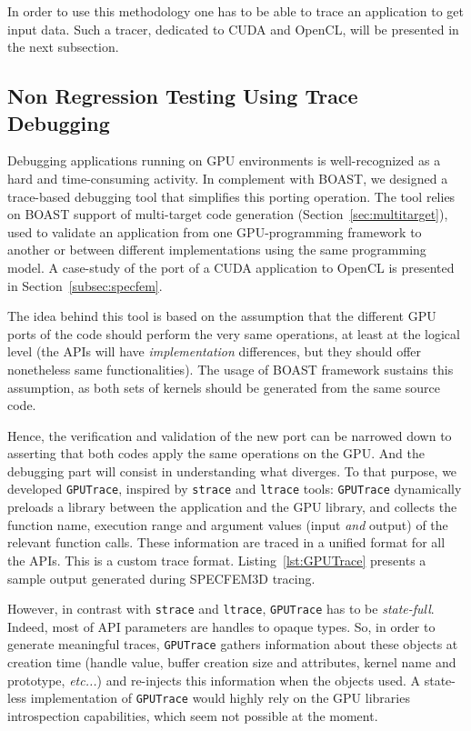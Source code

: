 \documentclass{IEEEtran}
\newcommand{\latin}[1]{\textit{#1}}
\newcommand{\etc}[1]{\latin{etc...}}
\newcommand{\code}[1]{\texttt{#1}}
\begin{document}
In order to use this methodology one has to be able to trace an application to
get input data. Such a tracer, dedicated to CUDA and OpenCL, will be presented
in the next subsection.

\subsection{Non Regression Testing Using Trace Debugging}
\label{sec:gputrace}

Debugging applications running on GPU environments is well-recognized as a hard
and time-consuming activity. In complement with BOAST, we designed a trace-based
debugging tool that simplifies this porting operation. The tool relies on BOAST
support of multi-target code generation (Section~\ref{sec:multitarget}), used to
validate an application from one GPU-programming framework to another or between
different implementations using the same programming model. A case-study of the
port of a CUDA application to OpenCL is presented in
Section~\ref{subsec:specfem}.

The idea behind this tool is based on the assumption that the different GPU
ports of the code should perform the very same operations, at least at the
logical level (the APIs will have \emph{implementation} differences, but they
should offer nonetheless same functionalities). The usage of BOAST framework
sustains this assumption, as both sets of kernels should be generated from the
same source code.

Hence, the verification and validation of the new port can be narrowed down to
asserting that both codes apply the same operations on the GPU. And the
debugging part will consist in understanding what diverges. To that purpose, we
developed \code{GPUTrace}, inspired by \code{strace} and \code{ltrace} tools:
\code{GPUTrace} dynamically preloads a library between the application and the
GPU library, and collects the function name, execution range and argument
values (input \emph{and} output) of the relevant function calls. These
information are traced in a unified format for all the APIs. This is a custom
trace format. Listing~\ref{lst:GPUTrace} presents a sample output generated
during SPECFEM3D tracing.

However, in contrast with \code{strace} and \code{ltrace}, \code{GPUTrace} has
to be \emph{state-full}. Indeed, most of API parameters are handles to opaque
types. So, in order to generate meaningful traces, \code{GPUTrace} gathers
information about these objects at creation time (handle value, buffer creation
size and attributes, kernel name and prototype, \etc{}) and re-injects this
information when the objects used. A state-less implementation of
\code{GPUTrace} would highly rely on the GPU libraries introspection
capabilities, which seem not possible at the moment.
\end{document}
